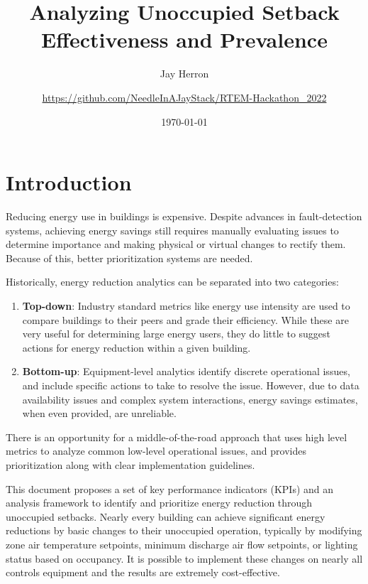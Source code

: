 \documentclass[a4paper]{article}
\begin{document}
\title{Analyzing Unoccupied Setback Effectiveness and Prevalence}
\author{
	Jay Herron
	\and
	\url{https://github.com/NeedleInAJayStack/RTEM-Hackathon\_2022}
}
\date{\today}
\maketitle

\section{Introduction}

Reducing energy use in buildings is expensive. Despite advances in fault-detection systems, achieving energy savings still requires manually evaluating issues to determine importance and making physical or virtual changes to rectify them. Because of this, better prioritization systems are needed.

Historically, energy reduction analytics can be separated into two categories:
\begin{enumerate}
\item{\textbf{Top-down}: Industry standard metrics like energy use intensity are used to compare buildings to their peers and grade their efficiency. While these are very useful for determining large energy users, they do little to suggest actions for energy reduction within a given building.}
\item{\textbf{Bottom-up}: Equipment-level analytics identify discrete operational issues, and include specific actions to take to resolve the issue. However, due to data availability issues and complex system interactions, energy savings estimates, when even provided, are unreliable.}
\end{enumerate}

There is an opportunity for a middle-of-the-road approach that uses high level metrics to analyze common low-level operational issues, and provides prioritization along with clear implementation guidelines.

This document proposes a set of key performance indicators (KPIs) and an analysis framework to identify and prioritize energy reduction through unoccupied setbacks. Nearly every building can achieve significant energy reductions by basic changes to their unoccupied operation, typically by modifying zone air temperature setpoints, minimum discharge air flow setpoints, or lighting status based on occupancy. It is possible to implement these changes on nearly all controls equipment and the results are extremely cost-effective.
\end{document}

